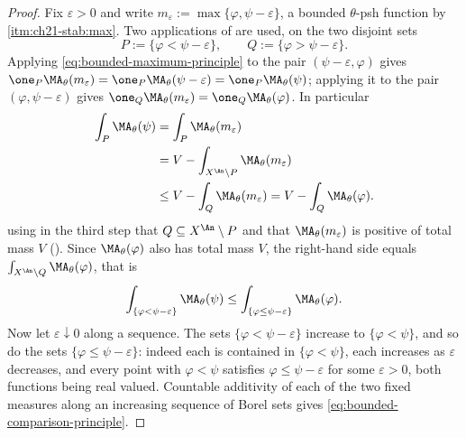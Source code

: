\begin{proof}
Fix \(\varepsilon>0\) and write \(m_\varepsilon:=\max\{\varphi,
\psi-\varepsilon\}\), a bounded \(\theta\)-psh function by
\,\cref{itm:ch21-stab:max}.  Two applications of
 are used, on the two disjoint sets
\[
 P:=\{\varphi<\psi-\varepsilon\},\qquad
 Q:=\{\varphi>\psi-\varepsilon\} .
\]
Applying \eqref{eq:bounded-maximum-principle} to the pair
\((\psi-\varepsilon,\varphi)\) gives
\(\one_P\MA_\theta(m_\varepsilon)=\one_P\MA_\theta(\psi-\varepsilon)
=\one_P\MA_\theta(\psi)\); applying it to the pair
\((\varphi,\psi-\varepsilon)\) gives
\(\one_Q\MA_\theta(m_\varepsilon)=\one_Q\MA_\theta(\varphi)\).  In
particular
\begin{equation}
\label{eq:ch25-comparison-step}
 \begin{aligned}
 \int_P\MA_\theta(\psi)&=\int_P\MA_\theta(m_\varepsilon)\\
 &=V-\int_{X^{\An}\setminus P}\MA_\theta(m_\varepsilon)\\
 &\leq V-\int_Q\MA_\theta(m_\varepsilon)
 =V-\int_Q\MA_\theta(\varphi).
 \end{aligned}
\end{equation}
using in the third step that \(Q\subseteq X^{\An}\setminus P\) and that
\(\MA_\theta(m_\varepsilon)\) is positive of total mass \(V\)
().  Since \(\MA_\theta(\varphi)\) also has
total mass \(V\), the right-hand side equals
\(\int_{X^{\An}\setminus Q}\MA_\theta(\varphi)\), that is
\[
 \int_{\{\varphi<\psi-\varepsilon\}}\MA_\theta(\psi)
 \leq\int_{\{\varphi\leq\psi-\varepsilon\}}\MA_\theta(\varphi).
\]
Now let \(\varepsilon\downarrow0\) along a sequence.  The sets
\(\{\varphi<\psi-\varepsilon\}\) increase to \(\{\varphi<\psi\}\), and so do
the sets \(\{\varphi\leq\psi-\varepsilon\}\): indeed each is contained in
\(\{\varphi<\psi\}\), each increases as \(\varepsilon\) decreases, and every
point with \(\varphi<\psi\) satisfies \(\varphi\leq\psi-\varepsilon\) for
some \(\varepsilon>0\), both functions being real valued.  Countable
additivity of each of the two fixed measures along an increasing sequence of
Borel sets gives \eqref{eq:bounded-comparison-principle}.
\end{proof}

